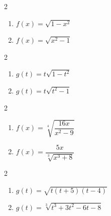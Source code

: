 \documentclass{ximera}
\begin{document}
\begin{multicols}{2}
\begin{enumerate}
\setcounter{enumi}{\value{HW}}
\item $f(x) = \sqrt{1 - x^{2}}$ \label{algfcngraphexfirst}
\item $f(x) = \sqrt{x^2-1}$

\setcounter{HW}{\value{enumi}}
\end{enumerate}
\end{multicols}

\begin{multicols}{2}
\begin{enumerate}
\setcounter{enumi}{\value{HW}}

\item $g(t) = t \sqrt{1-t^2}$
\item $g(t) = t \sqrt{t^2-1}$

\setcounter{HW}{\value{enumi}}
\end{enumerate}
\end{multicols}

\begin{multicols}{2}
\begin{enumerate}
\setcounter{enumi}{\value{HW}}

\item $f(x) = \sqrt[4]{\dfrac{16x}{x^{2} - 9}}$
\item $f(x) = \dfrac{5x}{\sqrt[3]{x^{3} + 8}}$
\setcounter{HW}{\value{enumi}}
\end{enumerate}
\end{multicols}


\begin{multicols}{2}
\begin{enumerate}
\setcounter{enumi}{\value{HW}}

\item $g(t) = \sqrt{t(t + 5)(t - 4)}$
\item $g(t) = \sqrt[3]{t^{3} + 3t^{2} - 6t - 8}$ \label{algfcngraphexlast}

\setcounter{HW}{\value{enumi}}
\end{enumerate}
\end{multicols}
\end{document}
